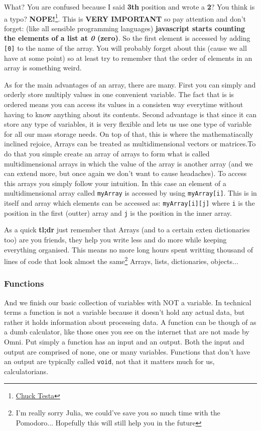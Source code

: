 What? You are confused because I said \textbf{3th} position and wrote a \textbf{2}? You think is a typo? \textbf{NOPE!}\footnote{\href{https://www.youtube.com/watch?v=LJP1DphOWPs}{Chuck Testa}}. This is \textbf{VERY IMPORTANT} so pay attention and don't forget: (like all sensible programming languages) \textbf{javascript  starts counting the elements of a list at \textit{0} (zero)}. So the first element is accessed by adding \texttt{[0]} to the name of the array. You will probably forget about this (cause we all have at some point) so at least try to remember that the order of elements in an array is something weird.

As for the main advantages of an array, there are many. First you can simply and orderly store multiply values in one convenient variable. The fact that is is ordered means you can access its values in a consisten way everytime without having to know anything about its contents. Second advantage is that since it can store any type of variables, it is very flexible and lets us use one type of variable for all our mass storage needs. On top of that, this is where the mathematiacally inclined rejoice, Arrays can be treated as multidimensional vectors or matrices.To do that you simple create an array of arrays to form what is called multidimensional arrays in which the value of the array is another array (and we can extend more, but once again we don't want to cause headaches). To access this arrays you simply follow your intuition. In this case an element of a multidimensional array called \texttt{myArray} is accessed by using \texttt{myArray[i]}. This is in itself and array which elements can be accessed as: \texttt{myArray[i][j]} where \texttt{i} is the position in the first (outter) array and \texttt{j} is the position in the inner array.

As a quick \large{\textbf{tl;dr}} just remember that Arrays (and to a certain exten dictionaries too) are you friends, they help you write less and do more while keeping everything organised. This means no more long hours spent writting thousand of lines of code that look almost the same\footnote{I'm really sorry Julia, we could've save you so much time with the Pomodoro... Hopefully this will still help you in the future}
Arrays, lists, dictionaries, objects...
\subsubsection{Functions}
\label{subsub:functions}

And we finish our basic collection of variables with NOT a variable. In technical terms a function is not a variable because it doesn't hold any actual data, but rather it holds information about processing data. A function can be though of as a dumb calculator, like those ones you see on the internet that are not made by Omni. Put simply a function has an input and an output. Both the input and output are comprised of none, one or many variables. Functions that don't have an output are typically called \texttt{void}, not that it matters much for us, calculatorians.

